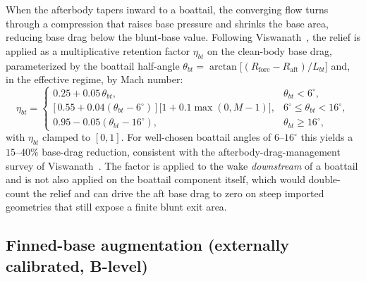 When the afterbody tapers inward to a boattail, the converging flow turns through
a compression that raises base pressure and shrinks the base area, reducing base
drag below the blunt-base value. Following Viswanath~\cite{viswanath1996}, the
relief is applied as a multiplicative retention factor $\eta_{bt}$ on the
clean-body base drag, parameterized by the boattail half-angle
$\theta_{bt} = \arctan\!\big[(R_{\text{fore}} - R_{\text{aft}})/L_{bt}\big]$ and,
in the effective regime, by Mach number:
%
\begin{equation}
\eta_{bt} =
\begin{cases}
0.25 + 0.05\,\theta_{bt}, & \theta_{bt} < 6^{\circ},\\[1.0ex]
\big[\,0.55 + 0.04(\theta_{bt} - 6^{\circ})\,\big]\,\big[1 + 0.1\max(0, M-1)\big],
   & 6^{\circ} \le \theta_{bt} < 16^{\circ},\\[1.0ex]
0.95 - 0.05(\theta_{bt} - 16^{\circ}), & \theta_{bt} \ge 16^{\circ},
\end{cases}
\label{eq:viswanath}
\end{equation}
%
with $\eta_{bt}$ clamped to $[0, 1]$. For well-chosen boattail angles of
$6$--$16^{\circ}$ this yields a $15$--$40\%$ base-drag reduction, consistent with
the afterbody-drag-management survey of Viswanath~\cite{viswanath1996}. The factor
is applied to the wake \emph{downstream} of a boattail and is not also applied on
the boattail component itself, which would double-count the relief and can drive
the aft base drag to zero on steep imported geometries that still expose a finite
blunt exit area.

\subsection{Finned-base augmentation (externally calibrated, B-level)}
\label{subsec:finnedbase}

